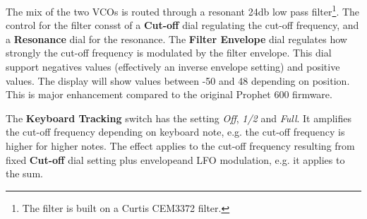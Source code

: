 The mix of the two VCOs is routed through a resonant 24db low pass filter\footnote{The filter is built on a Curtis CEM3372 filter.}. The control for the filter consst of a \textbf{Cut-off} dial regulating the cut-off frequency, and a \textbf{Resonance} dial for the resonance. The \textbf{Filter Envelope} dial regulates how strongly the cut-off frequency is modulated by the filter envelope. This dial support negatives values (effectively an inverse envelope setting) and positive values. The display will show values between -50 and 48 depending on position. This is major enhancement compared to the original Prophet 600 firmware.

The \textbf{Keyboard Tracking} switch has the setting \textit{Off}, \textit{1/2} and \textit{Full}. It amplifies the cut-off frequency depending on keyboard note, e.g. the cut-off frequency is higher for higher notes. The effect applies to the cut-off frequency resulting from fixed \textbf{Cut-off} dial setting plus envelopeand LFO modulation, e.g. it applies to the sum.  

